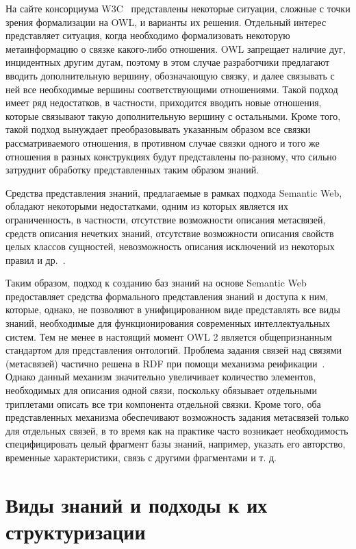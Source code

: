 На сайте консорциума W3C~\cite{N-aryRelations2006, RepresOWL2005} представлены некоторые ситуации, сложные с точки зрения формализации на OWL, и варианты их решения. Отдельный интерес представляет ситуация, когда необходимо формализовать некоторую метаинформацию о связке какого-либо отношения. OWL запрещает наличие дуг, инцидентных другим дугам, поэтому в этом случае разработчики предлагают вводить дополнительную вершину, обозначающую связку, и далее связывать с ней все необходимые вершины соответствующими отношениями. Такой подход имеет ряд недостатков, в частности, приходится вводить новые отношения, которые связывают такую дополнительную вершину с остальными. Кроме того, такой подход вынуждает преобразовывать указанным образом все связки рассматриваемого отношения, в противном случае связки одного и того же отношения в разных конструкциях будут представлены по-разному, что сильно затруднит обработку представленных таким образом знаний.

Средства представления знаний, предлагаемые в рамках подхода Semantic Web, обладают некоторыми недостатками, одним из которых является их ограниченность, в частности, отсутствие возможности описания метасвязей, средств описания нечетких знаний, отсутствие возможности описания свойств целых классов сущностей, невозможность описания исключений из некоторых правил и др.~\cite{Gorshkov2016}.

Таким образом, подход к созданию баз знаний на основе Semantic Web предоставляет средства формального представления знаний и доступа к ним, которые, однако, не позволяют в унифицированном виде представлять все виды знаний, необходимые для функционирования современных интеллектуальных систем. Тем не менее в настоящий момент OWL 2 является общепризнанным стандартом для представления онтологий. Проблема задания связей над связями (метасвязей) частично решена в RDF при помощи механизма реификации~\cite{Semantics}. Однако данный механизм значительно увеличивает количество элементов, необходимых для описания одной связи, поскольку обязывает отдельными триплетами описать все три компонента отдельной связки. Кроме того, оба представленных механизма обеспечивают возможность задания метасвязей только для отдельных связей, в то время как на практике часто возникает необходимость специфицировать целый фрагмент базы знаний, например, указать его авторство, временные характеристики, связь с другими фрагментами и т. д.
\newpage
\section{Виды знаний и подходы к их структуризации}

